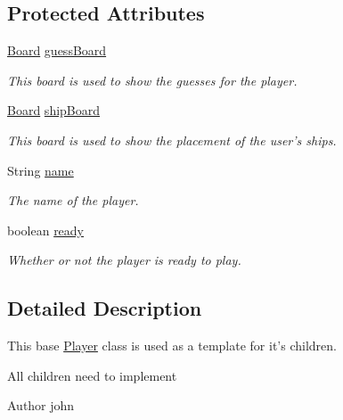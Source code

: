 \subsection*{Protected Attributes}
\begin{DoxyCompactItemize}
\item 
\hyperlink{classbattleShip_1_1Board}{Board} \hyperlink{classbattleShip_1_1Player_ad3cfcbcfee296ba644ea8f385d878799}{guess\-Board}
\begin{DoxyCompactList}\small\item\em This board is used to show the guesses for the player. \end{DoxyCompactList}\item 
\hyperlink{classbattleShip_1_1Board}{Board} \hyperlink{classbattleShip_1_1Player_a57e76a8f3bb9739c402cad1f2eb1205a}{ship\-Board}
\begin{DoxyCompactList}\small\item\em This board is used to show the placement of the user's ships. \end{DoxyCompactList}\item 
String \hyperlink{classbattleShip_1_1Player_a0be29098278ff1ccb8ebac1fc08546c2}{name}
\begin{DoxyCompactList}\small\item\em The name of the player. \end{DoxyCompactList}\item 
boolean \hyperlink{classbattleShip_1_1Player_aeeb80baff53736294a7e406b8d19e1ac}{ready}
\begin{DoxyCompactList}\small\item\em Whether or not the player is ready to play. \end{DoxyCompactList}\end{DoxyCompactItemize}


\subsection{Detailed Description}
This base \hyperlink{classbattleShip_1_1Player}{Player} class is used as a template for it's children. 

All children need to implement \begin{DoxyAuthor}{Author}
john 
\end{DoxyAuthor}


